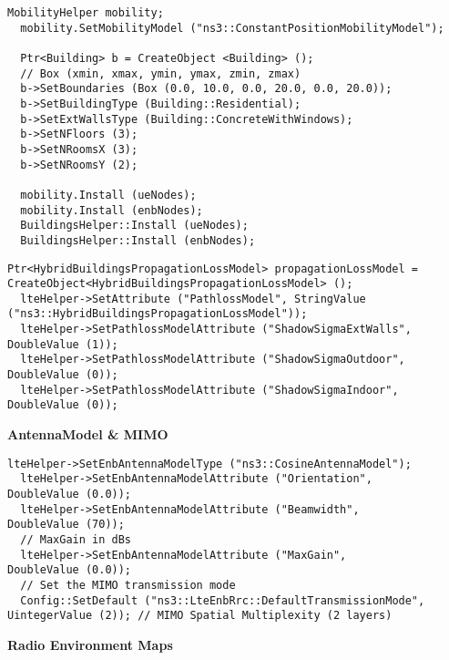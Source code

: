 \begin{lstlisting}[language=myC++,caption={Mobility Model}, captionpos=b]
  MobilityHelper mobility;
  mobility.SetMobilityModel ("ns3::ConstantPositionMobilityModel");

  Ptr<Building> b = CreateObject <Building> ();
  // Box (xmin, xmax, ymin, ymax, zmin, zmax)
  b->SetBoundaries (Box (0.0, 10.0, 0.0, 20.0, 0.0, 20.0));
  b->SetBuildingType (Building::Residential);
  b->SetExtWallsType (Building::ConcreteWithWindows);
  b->SetNFloors (3);
  b->SetNRoomsX (3);
  b->SetNRoomsY (2);

  mobility.Install (ueNodes);
  mobility.Install (enbNodes);
  BuildingsHelper::Install (ueNodes);
  BuildingsHelper::Install (enbNodes);
\end{lstlisting}

\begin{lstlisting}[language=myC++,caption={Pathloss Model}, captionpos=b]
  Ptr<HybridBuildingsPropagationLossModel> propagationLossModel = CreateObject<HybridBuildingsPropagationLossModel> ();
  lteHelper->SetAttribute ("PathlossModel", StringValue ("ns3::HybridBuildingsPropagationLossModel"));
  lteHelper->SetPathlossModelAttribute ("ShadowSigmaExtWalls",   DoubleValue (1));
  lteHelper->SetPathlossModelAttribute ("ShadowSigmaOutdoor",    DoubleValue (0));
  lteHelper->SetPathlossModelAttribute ("ShadowSigmaIndoor",     DoubleValue (0));
\end{lstlisting}

\textbf{AntennaModel \& MIMO}

\begin{lstlisting}[language=myC++,caption={Antenna \& MIMO Model}, captionpos=b]
  lteHelper->SetEnbAntennaModelType ("ns3::CosineAntennaModel");
  lteHelper->SetEnbAntennaModelAttribute ("Orientation",          DoubleValue (0.0));
  lteHelper->SetEnbAntennaModelAttribute ("Beamwidth",            DoubleValue (70));
  // MaxGain in dBs
  lteHelper->SetEnbAntennaModelAttribute ("MaxGain",              DoubleValue (0.0));
  // Set the MIMO transmission mode
  Config::SetDefault ("ns3::LteEnbRrc::DefaultTransmissionMode", UintegerValue (2)); // MIMO Spatial Multiplexity (2 layers)
\end{lstlisting}

\textbf{Radio Environment Maps}

